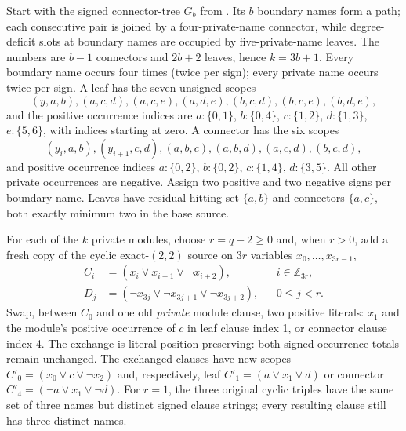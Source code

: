 \documentclass[10.5pt]{article}
\begin{document}
Start with the signed connector-tree $G_b$ from \cite{component}. Its $b$ boundary names form a path; each consecutive pair is joined by a four-private-name connector, while degree-deficit slots at boundary names are occupied by five-private-name leaves. The numbers are $b-1$ connectors and $2b+2$ leaves, hence $k=3b+1$. Every boundary name occurs four times (twice per sign); every private name occurs twice per sign. A leaf has the seven unsigned scopes
\[
(y,a,b), (a,c,d),(a,c,e),(a,d,e),(b,c,d),(b,c,e),(b,d,e),
\]
and the positive occurrence indices are $a:\{0,1\}$, $b:\{0,4\}$, $c:\{1,2\}$, $d:\{1,3\}$, $e:\{5,6\}$, with indices starting at zero. A connector has the six scopes
\[
(y_i,a,b),(y_{i+1},c,d),(a,b,c),(a,b,d),(a,c,d),(b,c,d),
\]
and positive occurrence indices $a:\{0,2\}$, $b:\{0,2\}$, $c:\{1,4\}$, $d:\{3,5\}$. All other private occurrences are negative. Assign two positive and two negative signs per boundary name. Leaves have residual hitting set $\{a,b\}$ and connectors $\{a,c\}$, both exactly minimum two in the base source.

For each of the $k$ private modules, choose $r=q-2\ge0$ and, when $r>0$, add a fresh copy of the cyclic exact-$(2,2)$ source on $3r$ variables $x_0,\dots,x_{3r-1}$,
\begin{align}\label{eq:cycle}
 C_i&=(x_i\vee x_{i+1}\vee\neg x_{i+2}), && i\in\mathbb Z_{3r},\\
 D_j&=(\neg x_{3j}\vee\neg x_{3j+1}\vee\neg x_{3j+2}),&&0\le j<r.
\end{align}
Swap, between $C_0$ and one old \emph{private} module clause, two positive literals: $x_1$ and the module's positive occurrence of $c$ in leaf clause index 1, or connector clause index 4. The exchange is literal-position-preserving: both signed occurrence totals remain unchanged. The exchanged clauses have new scopes $C'_0=(x_0\vee c\vee\neg x_2)$ and, respectively, leaf $C'_1=(a\vee x_1\vee d)$ or connector $C'_4=(\neg a\vee x_1\vee\neg d)$. For $r=1$, the three original cyclic triples have the same set of three names but distinct signed clause strings; every resulting clause still has three distinct names.
\end{document}
